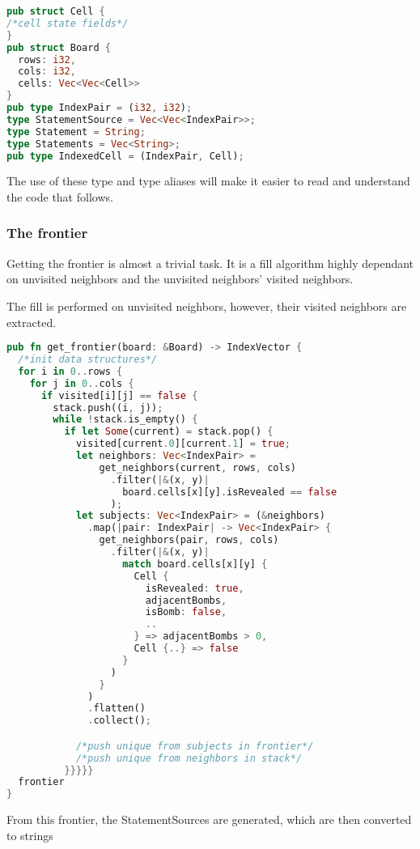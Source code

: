 \documentclass{article}
\begin{document}
\begin{lstlisting}[language=rust]
pub struct Cell {
/*cell state fields*/
}
pub struct Board {
  rows: i32,
  cols: i32,
  cells: Vec<Vec<Cell>>
}
pub type IndexPair = (i32, i32);
type StatementSource = Vec<Vec<IndexPair>>;
type Statement = String;
type Statements = Vec<String>;
pub type IndexedCell = (IndexPair, Cell);
\end{lstlisting}

            The use of these type and type aliases will make it easier to read and understand the code that follows.

        \subsubsection{The frontier}
            Getting the frontier is almost a trivial task. It is a fill algorithm highly dependant on unvisited neighbors and the unvisited neighbors' visited neighbors.
    
            The fill is performed on unvisited neighbors, however, their visited neighbors are extracted.

\begin{lstlisting}[language=rust]	
pub fn get_frontier(board: &Board) -> IndexVector {
  /*init data structures*/
  for i in 0..rows {
    for j in 0..cols {
      if visited[i][j] == false {
        stack.push((i, j));
        while !stack.is_empty() {
          if let Some(current) = stack.pop() {
            visited[current.0][current.1] = true;
            let neighbors: Vec<IndexPair> =
                get_neighbors(current, rows, cols)
                  .filter(|&(x, y)|
                    board.cells[x][y].isRevealed == false
                  );
            let subjects: Vec<IndexPair> = (&neighbors)
              .map(|pair: IndexPair| -> Vec<IndexPair> {
                get_neighbors(pair, rows, cols)
                  .filter(|&(x, y)|
                    match board.cells[x][y] {
                      Cell {
                        isRevealed: true,
                        adjacentBombs,
                        isBomb: false,
                        ..
                      } => adjacentBombs > 0,
                      Cell {..} => false
                    }
                  )
                }
              )
              .flatten()
              .collect();

            /*push unique from subjects in frontier*/
            /*push unique from neighbors in stack*/
          }}}}}
  frontier
}
\end{lstlisting}
            From this frontier, the StatementSources are generated, which are then converted to strings
\end{document}

